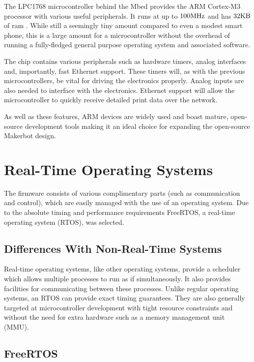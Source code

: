 			The LPC1768 microcontroller behind the Mbed provides the ARM Cortex-M3
			processor with various useful peripherals. It runs at up to $100\textrm{MHz}$ and
			has $32\textrm{KB}$ of ram \cite{lpc1768}.  While still a seemingly tiny amount
			compared to even a modest smart phone, this is a large amount for a
			microcontroller without the overhead of running a fully-fledged general
			purpose operating system and associated software.
			
			The chip contains various peripherals such as hardware timers, analog
			interfaces and, importantly, fast Ethernet support. These timers will, as
			with the previous microcontrollers, be vital for driving the electronics
			properly. Analog inputs are also needed to interface with the electronics.
			Ethernet support will allow the microcontroller to quickly receive
			detailed print data over the network.
			
			As well as these features, ARM devices are widely used and boast mature,
			open-source development tools making it an ideal choice for expanding the
			open-source Makerbot design.
			
	\section{Real-Time Operating Systems}
		
		The firmware consists of various complimentary parts (such as communication
		and control), which are easily managed with the use of an operating system.
		Due to the absolute timing and performance requirements FreeRTOS, a
		real-time operating system (RTOS), was selected.
		
		\subsection{Differences With Non-Real-Time Systems}
			
			Real-time operating systems, like other operating systems, provide a
			scheduler which allows multiple processes to run as if simultaneously. It
			also provides facilities for communicating between these processes. Unlike
			regular operating systems, an RTOS can provide exact timing guarantees.
			They are also generally targeted at microcontroller development with tight
			resource constraints and without the need for extra hardware such as a
			memory management unit (MMU).
			
		\subsection{FreeRTOS}
			
